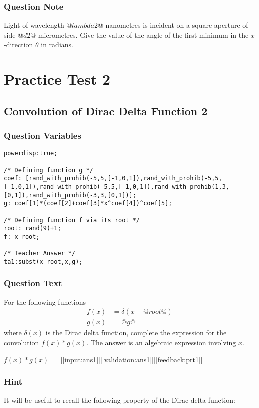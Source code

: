\documentclass[a4paper,10pt]{article}
\begin{document}
\subsubsection{Question Note}
Light of wavelength \(@lambda2@\) nanometres is incident on a square aperture of side \(@d2@\) micrometres. Give the value of the angle of the first minimum in the $x$-direction \(\theta\) in radians.

\section{Practice Test 2}

\subsection{Convolution of Dirac Delta Function 2}
\subsubsection{Question Variables}
\begin{lstlisting}
powerdisp:true;

/* Defining function g */
coef: [rand_with_prohib(-5,5,[-1,0,1]),rand_with_prohib(-5,5,[-1,0,1]),rand_with_prohib(-5,5,[-1,0,1]),rand_with_prohib(1,3,[0,1]),rand_with_prohib(-3,3,[0,1])];
g: coef[1]*(coef[2]+coef[3]*x^coef[4])^coef[5];

/* Defining function f via its root */
root: rand(9)+1;
f: x-root;

/* Teacher Answer */
ta1:subst(x-root,x,g);
\end{lstlisting}
\subsubsection{Question Text}
For the following functions \begin{align*} f(x)&= \delta(x-@root@) \\ g(x) &= @g@ \end{align*} where \(\delta(x)\) is the Dirac delta function, complete the expression for the convolution \(f(x) \ast g(x)\). The answer is an algebraic expression involving \(x\).

\(f(x) \ast g(x) = \) [[input:ans1]][[validation:ans1]][[feedback:prt1]]
\subsubsection{Hint}
It will be useful to recall the following property of the Dirac delta function: 
\end{document}
